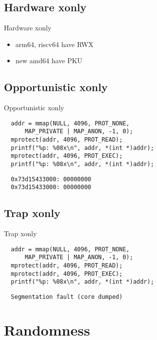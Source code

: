 \documentclass[14pt,aspectratio=169]{beamer}
\begin{document}
\subsection{Hardware xonly}
\begin{frame}{Hardware xonly}
\begin{itemize}
  \item arm64, riscv64 have RWX
  \item new amd64 have PKU
\end{itemize}
\end{frame}

\subsection{Opportunistic xonly}
\begin{frame}[fragile=singleslide]{Opportunistic xonly}
\begin{verbatim}
  addr = mmap(NULL, 4096, PROT_NONE,
      MAP_PRIVATE | MAP_ANON, -1, 0);
  mprotect(addr, 4096, PROT_READ);
  printf("%p: %08x\n", addr, *(int *)addr);
  mprotect(addr, 4096, PROT_EXEC);
  printf("%p: %08x\n", addr, *(int *)addr);
\end{verbatim}
\begin{verbatim}
  0x73d15433000: 00000000
  0x73d15433000: 00000000
\end{verbatim}
\end{frame}

\subsection{Trap xonly}
\begin{frame}[fragile=singleslide]{Trap xonly}
\begin{verbatim}
  addr = mmap(NULL, 4096, PROT_NONE,
      MAP_PRIVATE | MAP_ANON, -1, 0);
  mprotect(addr, 4096, PROT_READ);
  mprotect(addr, 4096, PROT_EXEC);
  printf("%p: %08x\n", addr, *(int *)addr);
\end{verbatim}
\begin{verbatim}
  Segmentation fault (core dumped)
\end{verbatim}
\end{frame}

\section{Randomness}
\end{document}

